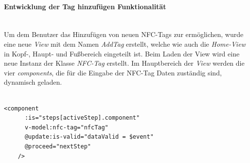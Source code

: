 \documentclass[10pt, a4paper]{article}
\begin{document}
\begin{onehalfspace}
\paragraph*{Entwicklung der \glqq Tag hinzufügen\grqq{} Funktionalität}$~$ \\
Um dem Benutzer das Hinzufügen von neuen NFC-Tags zur ermöglichen, wurde eine neue \textit{View} mit dem Namen \textit{AddTag} erstellt, welche wie auch
die \textit{Home-View} in Kopf-, Haupt- und Fußbereich eingeteilt ist. Beim Laden der View wird eine neue Instanz der Klasse \textit{NFC-Tag} erstellt.
Im Hauptbereich der \textit{View} werden die vier \textit{components}, die für die Eingabe der NFC-Tag Daten zuständig sind, dynamisch geladen.
\\~\\
\begin{minipage}{\textwidth}
  \begin{lstlisting}[caption={Dynamisches Laden der components von AddTag}, captionpos=b]
    <component
      :is="steps[activeStep].component"
      v-model:nfc-tag="nfcTag"
      @update:is-valid="dataValid = $event"
      @proceed="nextStep"
    />
  \end{lstlisting}
\end{minipage}



\end{onehalfspace}
\end{document}
